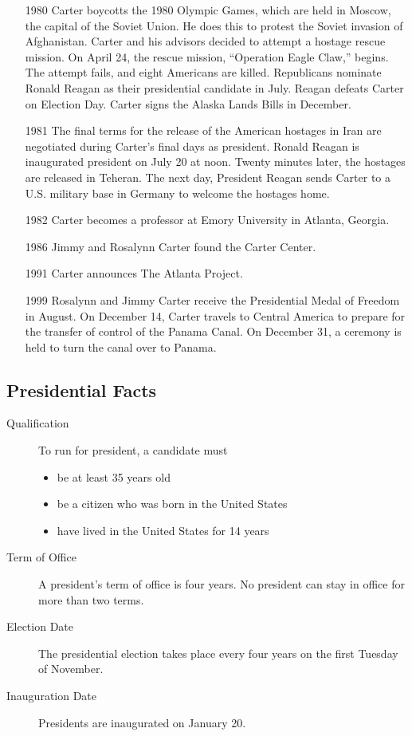 \documentclass{article}
\begin{document}
\begin{itemize}
\item[1980] Carter boycotts the 1980 Olympic Games, which are held in Moscow, the capital of the Soviet Union. He does this to protest the Soviet invasion of Afghanistan. Carter and his advisors decided to attempt a hostage rescue mission. On April 24, the rescue mission, ``Operation Eagle Claw,'' begins. The attempt fails, and eight Americans are killed. Republicans nominate Ronald Reagan as their presidential candidate in July. Reagan defeats Carter on Election Day. Carter signs the Alaska Lands Bills in December.

\item[1981] The final terms for the release of the American hostages in Iran are negotiated during Carter's final days as president. Ronald Reagan is inaugurated president on July 20 at noon. Twenty minutes later, the hostages are released in Teheran. The next day, President Reagan sends Carter to a U.S. military base in Germany to welcome the hostages home.

\item[1982] Carter becomes a professor at Emory University in Atlanta, Georgia.

\item[1986] Jimmy and Rosalynn Carter found the Carter Center.

\item[1991] Carter announces The Atlanta Project.

\item[1999] Rosalynn and Jimmy Carter receive the Presidential Medal of Freedom in August. On December 14, Carter travels to Central America to prepare for the transfer of control of the Panama Canal. On December 31, a ceremony is held to turn the canal over to Panama.

\end{itemize}

\subsection*{Presidential Facts}
\begin{description}
\item[Qualification] To run for president, a candidate must
	\begin{itemize}
	\item be at least 35 years old
	\item be a citizen who was born in the United States
	\item have lived in the United States for 14 years
	\end{itemize}
\item[Term of Office] A president's term of office is four years. No president can stay in office for more than two terms.
\item[Election Date] The presidential election takes place every four years on the first Tuesday of November.
\item[Inauguration Date] Presidents are inaugurated on January 20.
\end{description}
\end{document}
